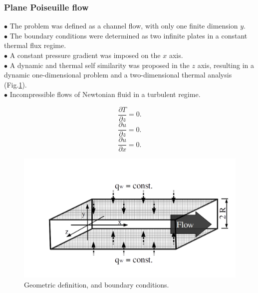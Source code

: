 \documentclass[xcolor=dvipsnames,8pt,aspectratio=34]{beamer}
\begin{document}
	
	
	
	
		\begin{frame}
			\frametitle{Plane Poiseuille flow}
			$\bullet$ The problem was defined as a channel flow, with only one finite dimension $y$. \\
			$\bullet$ The boundary conditions were determined as two infinite plates in a constant thermal flux regime.\\
			$\bullet$ A constant pressure gradient was imposed on the $x$ axis.\\
			$\bullet$ A dynamic and thermal self similarity was proposed in the $z$ axis, resulting in a dynamic one-dimensional problem and a two-dimensional thermal analysis (Fig.\ref{figure.1}). \\
			$\bullet$ Incompressible flows of Newtonian fluid in a turbulent regime.\\
			\begin{minipage}[h!]{0.3\textwidth}
				\begin{equation*}
				 \frac{\partial T }{\partial z} = 0.
				\end{equation*}
				\begin{equation*}
				\frac{\partial u }{\partial z} = 0.
				\end{equation*}
				\begin{equation*}
				\frac{\partial u }{\partial x} = 0.
				\end{equation*}
			\end{minipage}
			\begin{minipage}[h!]{0.5\textwidth}
			\begin{figure}[h!]
				\centering
				\includegraphics[trim={2.0 0.5 0.5 0.5}, angle=0, clip , scale=0.30]{fotos_formatacao_final/canal1}
				\caption{Geometric definition, and boundary conditions.}
				\label{figure.1}
			\end{figure}
			\end{minipage}
			\\
		\end{frame}
	
\end{document}
